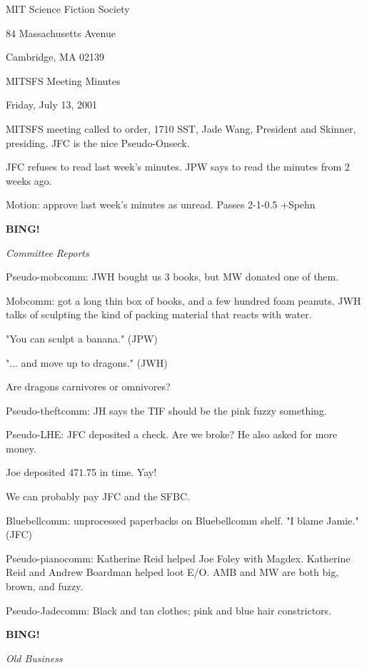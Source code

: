 \documentclass[12pt]{article}
\newcommand{\bing}{{\bf BING!} }
\newcommand{\goto}[1]{\bing \vskip 12pt \centerline{{\em{#1}}}}
\begin{document}
\begin{center}

MIT Science Fiction Society 

84 Massachusetts Avenue

Cambridge, MA 02139

\vspace{12pt}

MITSFS Meeting Minutes 

Friday, July 13, 2001

\end{center}
 
\vspace{18pt}

\setlength{\parskip}{6pt}

\noindent
MITSFS meeting called to order, 1710 SST, Jade Wang, President and
Skinner, presiding. JFC is the nice Pseudo-Onseck.

JFC refuses to read last week's minutes. JPW says to read the minutes from 2 weeks ago.

Motion: approve last week's minutes as unread. Passes 2-1-0.5 +Spehn

\goto{Committee Reports}

Pseudo-mobcomm: JWH bought us 3 books, but MW donated one of them.

Mobcomm: got a long thin box of books, and a few hundred foam peanuts. JWH talks of sculpting the kind of packing material that reacts with water.

"You can sculpt a banana." (JPW)

"... and move up to dragons." (JWH)

Are dragons carnivores or omnivores?

Pseudo-theftcomm: JH says the TIF should be the pink fuzzy something.

Pseudo-LHE: JFC deposited a check. Are we broke? He also asked for more money.

Joe deposited 471.75 in time. Yay!

We can probably pay JFC and the SFBC.

Bluebellcomm: unprocessed paperbacks on Bluebellcomm shelf. "I blame Jamie." (JFC)

Pseudo-pianocomm: Katherine Reid helped Joe Foley with Magdex. Katherine Reid and Andrew Boardman helped loot E/O. AMB and MW are both big, brown, and fuzzy.

Pseudo-Jadecomm: Black and tan clothes; pink and blue hair constrictors.

\goto{Old Business}
\end{document}
